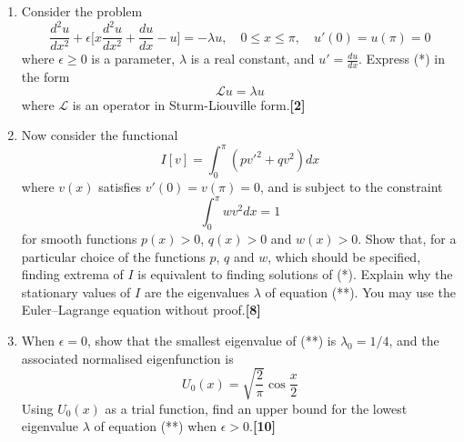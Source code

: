 \documentclass[a4paper]{article}
\begin{document}
\begin{qns}\leavevmode
\begin{enumerate}[label=(\roman*)]
\item Consider the problem
\begin{equation}
    \frac{d^2u}{dx^2}+\epsilon\bigg[x\frac{d^2u}{dx^2}+\frac{du}{dx}-u\bigg]=-\lambda u,\quad0\leq x\leq\pi,\quad u'(0)=u(\pi)=0\tag{*}
\end{equation}
where $\epsilon\geq0$ is a parameter, $\lambda$ is a real constant, and $u'=\frac{du}{dx}$. Express (*) in the form
\begin{equation}
    \mathcal{L}u=\lambda u\tag{**}
\end{equation}
where $\mathcal{L}$ is an operator in Sturm-Liouville form.\hfill\textbf{[2]}
\item Now consider the functional
$$I[v]=\int_0^\pi(pv'^2+qv^2)dx$$
where $v(x)$ satisfies $v'(0) = v(\pi) = 0$, and is subject to the constraint
$$\int_0^\pi wv^2dx=1$$
for smooth functions $p(x) > 0$, $q(x) > 0$ and $w(x) > 0$. Show that, for a particular choice of the functions $p$, $q$ and $w$, which should be specified, finding extrema of $I$ is equivalent to finding solutions of (*). Explain why the stationary values of $I$ are the eigenvalues $\lambda$ of equation (**). You may use the Euler–Lagrange equation without proof.\hfill\textbf{[8]}
\item When $\epsilon=0$, show that the smallest eigenvalue of (**) is $\lambda_0=1/4$, and the associated normalised eigenfunction is
$$U_0(x)=\sqrt{\frac{2}{\pi}}\cos\frac{x}{2}$$
Using $U_0(x)$ as a trial function, find an upper bound for the lowest eigenvalue $\lambda$ of equation (**) when $\epsilon>0$.\hfill\textbf{[10]}
\end{enumerate}
\end{qns}
\end{document}
